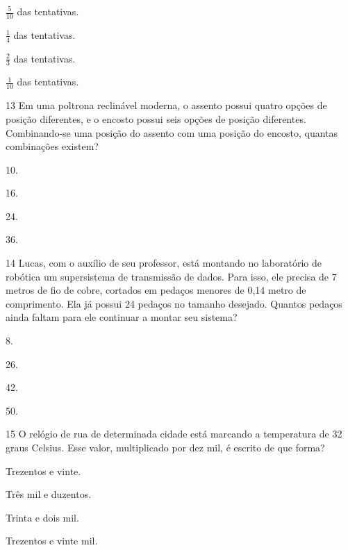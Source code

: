 \begin{multicols}{2}
\begin{escolha}
\item
  $\frac{5}{10}$ das tentativas.
\item
  $\frac{1}{4}$ das tentativas.
\item
  $\frac{2}{3}$ das tentativas.
\item
  $\frac{1}{10}$ das tentativas.
\end{escolha}
\end{multicols}


\num{13} Em uma poltrona reclinável moderna, o assento possui quatro opções de posição
diferentes, e o encosto possui seis opções de posição diferentes. Combinando-se uma posição do assento com uma posição do encosto, quantas combinações existem?

\begin{multicols}{2}
\begin{escolha}
\item
  10.
\item
  16.
\item
  24.
\item
  36.
\end{escolha}
\end{multicols}


\num{14} Lucas, com o auxílio de seu professor, está montando no laboratório de
robótica um supersistema de transmissão de dados. Para isso, ele
precisa de 7 metros de fio de cobre, cortados em pedaços menores de 0,14
metro de comprimento. Ela já possui 24 pedaços no tamanho desejado. Quantos pedaços ainda
faltam para ele continuar a montar seu sistema?

\begin{multicols}{2}
\begin{escolha}
\item
  8.
\item
  26.
\item
  42.
\item
  50.
\end{escolha}
\end{multicols}


\num{15} O relógio de rua de determinada cidade está marcando a temperatura
de 32 graus Celsius. Esse valor, multiplicado por dez mil, é escrito de que forma?

\begin{multicols}{2}
\begin{escolha}
\item Trezentos e vinte.
\item Três mil e duzentos.
\item Trinta e dois mil.
\item Trezentos e vinte mil.
\end{escolha}
\end{multicols}

